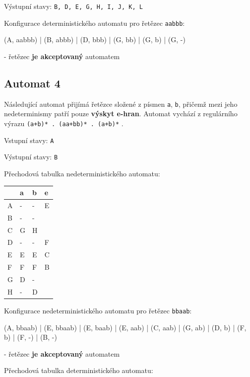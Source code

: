 \documentclass[11pt]{article}
\begin{document}
\bigskip

Výstupní stavy: \texttt{B, D, E, G, H, I, J, K, L}

\bigskip

Konfigurace deterministického automatu pro řetězec \texttt{aabbb}:

(A, aabbb) | (B, abbb) | (D, bbb) | (G, bb) | (G, b) | (G, -)

- řetězec \textbf{je akceptovaný} automatem

\newpage

\subsection{Automat 4}
Následující automat přijímá řetězce složené z písmen \texttt{a}, \texttt{b}, přičemž mezi jeho nedeterminismy patří pouze \textbf{výskyt e-hran}. Automat vychází z regulárního výrazu \texttt{(a+b)* . (aa+bb)* . (a+b)*} .

\bigskip

Vstupní stavy: \texttt{A}

Výstupní stavy: \texttt{B}

\bigskip

Přechodová tabulka nedeterministického automatu:

\bigskip

\begin{tabular}{| l | l | l || l |}
\hline
  & a & b & e \\ \hline
A & - & - & E \\ \hline
B & - & - &  \\ \hline
C & G & H &  \\ \hline
D & - & - & F \\ \hline
E & E & E & C \\ \hline
F & F & F & B \\ \hline
G & D & - &  \\ \hline
H & - & D &  \\
\hline
\end{tabular}

\bigskip

Konfigurace nedeterministického automatu pro řetězec \texttt{bbaab}:

(A, bbaab) | (E, bbaab) | (E, baab) | (E, aab) | (C, aab) | (G, ab) | (D, b) | (F, b) | (F, -) | (B, -)

- řetězec \textbf{je akceptovaný} automatem

\bigskip

Přechodová tabulka deterministického automatu:
\end{document}
